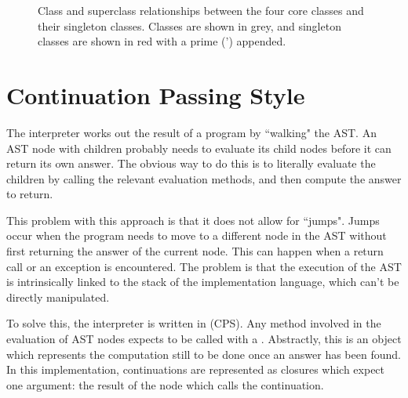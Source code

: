 \begin{figure}
\begin{center}
\caption{Class and superclass relationships between the four core classes and their singleton classes. Classes are shown in grey, and singleton classes are shown in red with a prime (') appended.}
\label{fig:core_relationships}
\end{center}
\end{figure}

\section{Continuation Passing Style}

The interpreter works out the result of a program by ``walking" the AST. An AST node with children probably needs to evaluate its child nodes before it can return its own answer. The obvious way to do this is to literally evaluate the children by calling the relevant evaluation methods, and then compute the answer to return.

This problem with this approach is that it does not allow for ``jumps". Jumps occur when the program needs to move to a different node in the AST without first returning the answer of the current node. This can happen when a return call or an exception is encountered. The problem is that the execution of the AST is intrinsically linked to the stack of the implementation language, which can't be directly manipulated.

To solve this, the interpreter is written in  (CPS). Any method involved in the evaluation of AST nodes expects to be called with a . Abstractly, this is an object which represents the computation still to be done once an answer has been found. In this implementation, continuations are represented as closures which expect one argument: the result of the node which calls the continuation.

